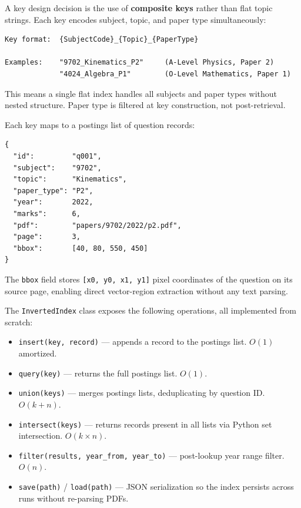 \documentclass[10pt]{article}
\begin{document}
A key design decision is the use of \textbf{composite keys} rather than flat topic strings. Each key encodes subject, topic, and paper type simultaneously:

\begin{lstlisting}
Key format:  {SubjectCode}_{Topic}_{PaperType}

Examples:    "9702_Kinematics_P2"     (A-Level Physics, Paper 2)
             "4024_Algebra_P1"        (O-Level Mathematics, Paper 1)
\end{lstlisting}

This means a single flat index handles all subjects and paper types without nested structure. Paper type is filtered at key construction, not post-retrieval.

Each key maps to a postings list of question records:

\begin{lstlisting}[language={}]
{
  "id":         "q001",
  "subject":    "9702",
  "topic":      "Kinematics",
  "paper_type": "P2",
  "year":       2022,
  "marks":      6,
  "pdf":        "papers/9702/2022/p2.pdf",
  "page":       3,
  "bbox":       [40, 80, 550, 450]
}
\end{lstlisting}

The \texttt{bbox} field stores \texttt{[x0, y0, x1, y1]} pixel coordinates of the question on its source page, enabling direct vector-region extraction without any text parsing.

The \texttt{InvertedIndex} class exposes the following operations, all implemented from scratch:

\begin{itemize}
    \item \texttt{insert(key, record)} --- appends a record to the postings list. $O(1)$ amortized.
    \item \texttt{query(key)} --- returns the full postings list. $O(1)$.
    \item \texttt{union(keys)} --- merges postings lists, deduplicating by question ID. $O(k + n)$.
    \item \texttt{intersect(keys)} --- returns records present in all lists via Python set intersection. $O(k \times n)$.
    \item \texttt{filter(results, year\_from, year\_to)} --- post-lookup year range filter. $O(n)$.
    \item \texttt{save(path)} / \texttt{load(path)} --- JSON serialization so the index persists across runs without re-parsing PDFs.
\end{itemize}
\end{document}
